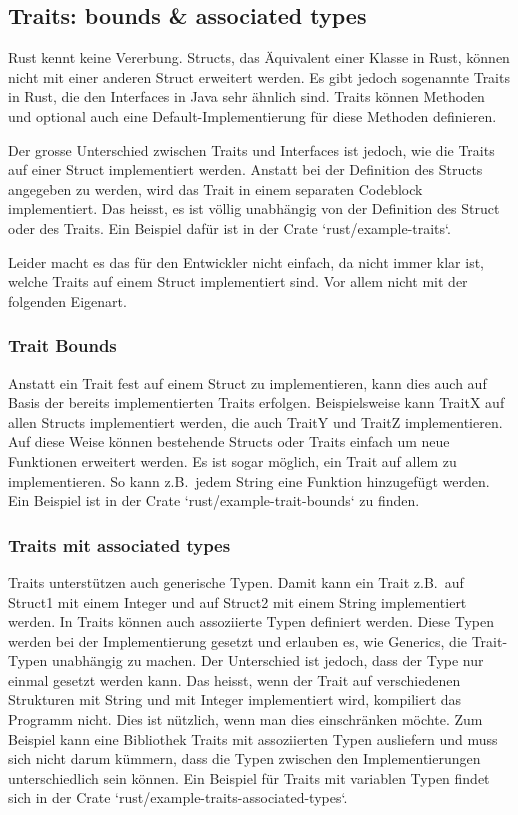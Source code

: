 \documentclass[letterpaper,12pt]{article}
\begin{document}
    \subsection{Traits: bounds \& associated types}\label{subsec:traits:-bounds-&-associated-types}
    Rust kennt keine Vererbung.
    Structs, das Äquivalent einer Klasse in Rust, können nicht mit einer anderen Struct erweitert werden.
    Es gibt jedoch sogenannte Traits in Rust, die den Interfaces in Java sehr ähnlich sind.
    Traits können Methoden und optional auch eine Default-Implementierung für diese Methoden definieren.

    Der grosse Unterschied zwischen Traits und Interfaces ist jedoch, wie die Traits auf einer Struct implementiert werden.
    Anstatt bei der Definition des Structs angegeben zu werden, wird das Trait in einem separaten Codeblock implementiert.
    Das heisst, es ist völlig unabhängig von der Definition des Struct oder des Traits.
    Ein Beispiel dafür ist in der Crate `rust/example-traits`.

    Leider macht es das für den Entwickler nicht einfach, da nicht immer klar ist, welche Traits auf einem Struct implementiert sind.
    Vor allem nicht mit der folgenden Eigenart.

    \subsubsection{Trait Bounds}\label{subsubsec:trait-bounds}
    Anstatt ein Trait fest auf einem Struct zu implementieren, kann dies auch auf Basis der bereits implementierten Traits erfolgen.
    Beispielsweise kann TraitX auf allen Structs implementiert werden, die auch TraitY und TraitZ implementieren.
    Auf diese Weise können bestehende Structs oder Traits einfach um neue Funktionen erweitert werden.
    Es ist sogar möglich, ein Trait auf allem zu implementieren.
    So kann z.B.\ jedem String eine Funktion hinzugefügt werden.
    Ein Beispiel ist in der Crate `rust/example-trait-bounds` zu finden.

    \subsubsection{Traits mit associated types}\label{subsubsec:traits-associated-types}
    Traits unterstützen auch generische Typen.
    Damit kann ein Trait z.B.\ auf Struct1 mit einem Integer und auf Struct2 mit einem String implementiert werden.
    In Traits können auch assoziierte Typen definiert werden.
    Diese Typen werden bei der Implementierung gesetzt und erlauben es, wie Generics, die Trait-Typen unabhängig zu machen.
    Der Unterschied ist jedoch, dass der Type nur einmal gesetzt werden kann.
    Das heisst, wenn der Trait auf verschiedenen Strukturen mit String und mit Integer implementiert wird, kompiliert das Programm nicht.
    Dies ist nützlich, wenn man dies einschränken möchte.
    Zum Beispiel kann eine Bibliothek Traits mit assoziierten Typen ausliefern und muss sich nicht darum kümmern,
        dass die Typen zwischen den Implementierungen unterschiedlich sein können.
    Ein Beispiel für Traits mit variablen Typen findet sich in der Crate `rust/example-traits-associated-types`.
\end{document}
